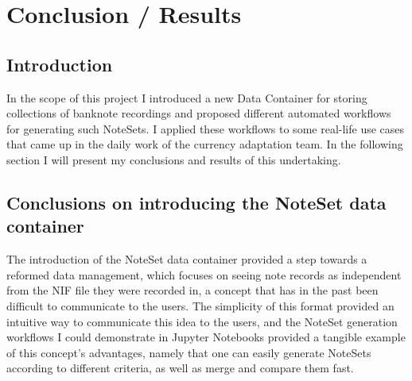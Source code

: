 \chapter{Conclusion / Results}
\label{chap:conclusions}

\section{Introduction}
In the scope of this project I introduced a new Data Container for storing collections of banknote recordings and proposed different automated workflows for generating such NoteSets. I applied these workflows to some real-life use cases that came up in the daily work of the currency adaptation team. In the following section I will present my conclusions and results of this undertaking.

\section{Conclusions on introducing the NoteSet data container}

The introduction of the NoteSet data container provided a step towards a reformed data management, which focuses on seeing note records as independent from the NIF file they were recorded in, a concept that has in the past been difficult to communicate to the users. The simplicity of this format provided an intuitive way to communicate this idea to the users, and the NoteSet generation workflows I could demonstrate in Jupyter Notebooks provided a tangible example of this concept's advantages, namely that one can easily generate NoteSets according to different criteria, as well as merge and compare them fast.

